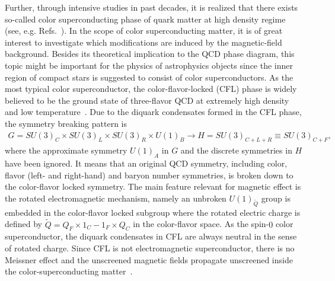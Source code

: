 \documentclass[12pt]{article}
\begin{document}
Further, through intensive studies in past decades, it is realized that there exists so-called color
superconducting phase of quark matter at high density regime (see, e.g.
Refs.~\cite{alford2004dense,buballa2005njl}). In the scope of color superconducting matter, it is of
great interest to investigate which modifications are induced by the magnetic-field background.
Besides its theoretical implication to the QCD phase diagram, this topic might be important for the physics of astrophysics objects since the inner region of compact stars is suggested to consist of color superconductors.
As the most typical color superconductor, the color-flavor-locked (CFL) phase is widely believed to be
the ground state of three-flavor QCD at extremely high density and low temperature~\cite{alford1998qcd}. Due to the
diquark condensates formed in the CFL phase, the symmetry breaking pattern is
\begin{eqnarray}
G=SU(3)_{C}\times SU(3)_{L}
\times SU(3)_{R}\times U(1)_{B} \rightarrow H=SU(3)_{C+L+R}\equiv SU(3)_{C+F},\label{cfl}
\end{eqnarray}
where the approximate symmetry $U(1)_{A}$ in $G$ and the discrete symmetries in $H$ have been ignored.
It means that an original QCD symmetry, including color, flavor (left- and right-hand) and baryon number
symmetries, is broken down to the color-flavor locked symmetry.
The main feature relevant for magnetic effect is the rotated electromagnetic mechanism, namely an unbroken
$U(1)_{\widetilde{Q}}$ group is embedded in the color-flavor locked subgroup where the rotated electric
charge is defined by $\widetilde{Q}=Q_{F}\times {1}_{C}-{1}_{F}\times Q_{C}$ in the color-flavor space.
As the spin-$0$ color superconductor, the diquark condensates in CFL are always neutral in the sense of
rotated charge.
Since CFL is not electromagnetic superconductor, there is no Meissner effect and the unscreened magnetic
fields propagate unscreened inside the color-superconducting matter~\cite{alford1998qcd,alford2000magnetic}.
\end{document}
